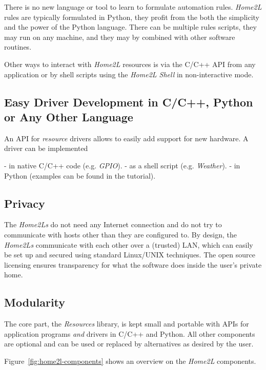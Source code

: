 \documentclass[12pt,english,parskip=half]{scrreprt}
\begin{document}
There is no new language or tool to learn to formulate automation rules.
\emph{Home2L} rules are typically formulated in Python, they profit from the
both the simplicity and the power of the Python language.
There can be multiple rules scripts, they may run on any machine, and
they may by combined with other software routines.

Other ways to interact with \emph{Home2L} resources is via the C/C++ API from any
application or by shell scripts using the \emph{Home2L Shell} in non-interactive mode.


\subsection*{Easy Driver Development in C/C++, Python or Any Other Language}

An API for \emph{resource} drivers allows to easily add support for new hardware.
A driver can be implemented

- in native C/C++ code (e.g. \emph{GPIO}).
- as a shell script (e.g. \emph{Weather}).
- in Python (examples can be found in the tutorial).


\subsection*{Privacy}

The \emph{Home2Ls} do not need any Internet connection and do not try to communicate
with hosts other than they are configured to. By design, the \emph{Home2Ls}
communicate with each other over a (trusted) LAN, which can easily be set up
and secured using standard Linux/UNIX techniques. The open source licensing ensures
transparency for what the software does inside the user's private home.


\subsection*{Modularity}

The core part, the \emph{Resources} library, is kept small and portable with APIs
for application programs \emph{and} drivers in C/C++ and Python. All other components
are optional and can be used or replaced by alternatives as desired by the user.

Figure~\ref{fig:home2l-components} shows an overview on the \emph{Home2L} components.
\end{document}
